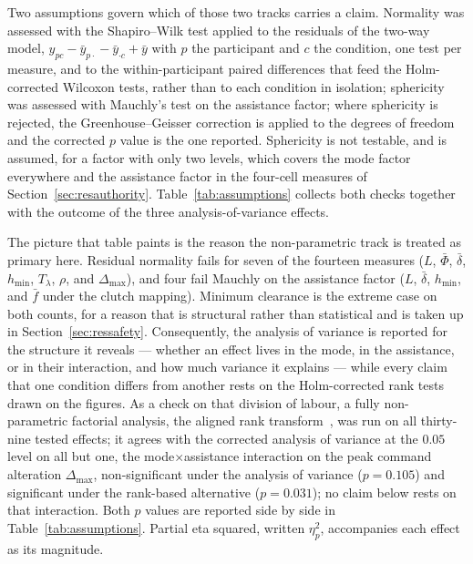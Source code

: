 \documentclass[12pt,a4paper,twoside,openright]{report}
\begin{document}
Two assumptions govern which of those two tracks carries a claim. Normality was assessed with the Shapiro--Wilk test applied to the residuals of the two-way model, $y_{pc} - \bar y_{p\cdot} - \bar y_{\cdot c} + \bar y$ with $p$ the participant and $c$ the condition, one test per measure, and to the within-participant paired differences that feed the Holm-corrected Wilcoxon tests, rather than to each condition in isolation; sphericity was assessed with Mauchly's test on the assistance factor; where sphericity is rejected, the Greenhouse--Geisser correction is applied to the degrees of freedom and the corrected $p$ value is the one reported. Sphericity is not testable, and is assumed, for a factor with only two levels, which covers the mode factor everywhere and the assistance factor in the four-cell measures of Section~\ref{sec:resauthority}. Table~\ref{tab:assumptions} collects both checks together with the outcome of the three analysis-of-variance effects.

The picture that table paints is the reason the non-parametric track is treated as primary here. Residual normality fails for seven of the fourteen measures ($L$, $\bar\Phi$, $\bar\delta$, $h_{\min}$, $T_\lambda$, $\rho$, and $\Delta_{\max}$), and four fail Mauchly on the assistance factor ($L$, $\bar\delta$, $h_{\min}$, and $\bar f$ under the clutch mapping). Minimum clearance is the extreme case on both counts, for a reason that is structural rather than statistical and is taken up in Section~\ref{sec:ressafety}. Consequently, the analysis of variance is reported for the structure it reveals --- whether an effect lives in the mode, in the assistance, or in their interaction, and how much variance it explains --- while every claim that one condition differs from another rests on the Holm-corrected rank tests drawn on the figures. As a check on that division of labour, a fully non-parametric factorial analysis, the aligned rank transform~\cite{wobbrock2011art}, was run on all thirty-nine tested effects; it agrees with the corrected analysis of variance at the $0.05$ level on all but one, the mode$\times$assistance interaction on the peak command alteration $\Delta_{\max}$, non-significant under the analysis of variance ($p = 0.105$) and significant under the rank-based alternative ($p = 0.031$); no claim below rests on that interaction. Both $p$ values are reported side by side in Table~\ref{tab:assumptions}. Partial eta squared, written $\eta^2_p$, accompanies each effect as its magnitude.
\end{document}
